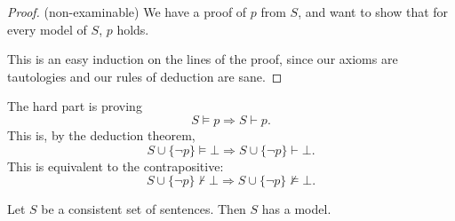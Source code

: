 \documentclass[a4paper]{article}
\begin{document}
\begin{proof}(non-examinable)
  We have a proof of $p$ from $S$, and want to show that for every model of $S$, $p$ holds.

  This is an easy induction on the lines of the proof, since our axioms are tautologies and our rules of deduction are sane.
\end{proof}

The hard part is proving
\[
  S\models p \Rightarrow S\vdash p.
\]
This is, by the deduction theorem,
\[
  S\cup \{\neg p\}\models \bot \Rightarrow S\cup \{\neg p\}\vdash \bot.
\]
This is equivalent to the contrapositive:
\[
  S\cup \{\neg p\} \not\vdash \bot \Rightarrow S\cup \{\neg p\}\not\models \bot.
\]

\begin{thm}
  Let $S$ be a consistent set of sentences. Then $S$ has a model.
\end{thm}
\end{document}

